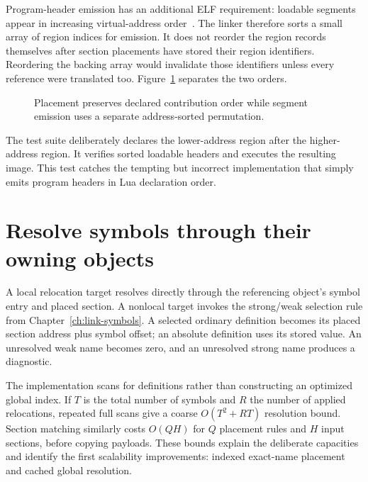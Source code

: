 Program-header emission has an additional ELF requirement: loadable segments appear in increasing virtual-address order~\cite{xinuos-2026-elf}.
The linker therefore sorts a small array of region indices for emission.
It does not reorder the region records themselves after section placements have stored their region identifiers.
Reordering the backing array would invalidate those identifiers unless every reference were translated too.
Figure~\ref{fig:ch60-order} separates the two orders.

\begin{figure}[htbp]
\centering
{}
\caption{Placement preserves declared contribution order while segment emission uses a separate address-sorted permutation.}
\label{fig:ch60-order}
\end{figure}

The test suite deliberately declares the lower-address region after the higher-address region.
It verifies sorted loadable headers and executes the resulting image.
This test catches the tempting but incorrect implementation that simply emits program headers in Lua declaration order.

\section{Resolve symbols through their owning objects}
\label{sec:ch60-symbols}

A local relocation target resolves directly through the referencing object's symbol entry and placed section.
A nonlocal target invokes the strong/weak selection rule from Chapter~\ref{ch:link-symbols}.
A selected ordinary definition becomes its placed section address plus symbol offset; an absolute definition uses its stored value.
An unresolved weak name becomes zero, and an unresolved strong name produces a diagnostic.

The implementation scans for definitions rather than constructing an optimized global index.
If $T$ is the total number of symbols and $R$ the number of applied relocations, repeated full scans give a coarse $O(T^2+RT)$ resolution bound.
Section matching similarly costs $O(QH)$ for $Q$ placement rules and $H$ input sections, before copying payloads.
These bounds explain the deliberate capacities and identify the first scalability improvements: indexed exact-name placement and cached global resolution.

